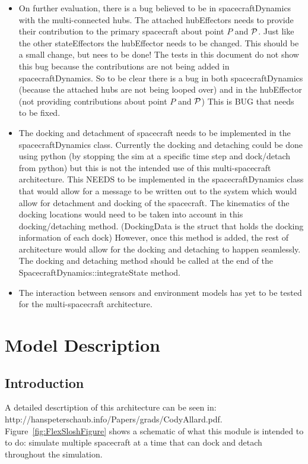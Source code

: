 \begin{itemize}
\item On further evaluation, there is a bug believed to be in spacecraftDynamics with the multi-connected hubs. The attached hubEffectors needs to provide their contribution to the primary spacecraft about point $P$ and $\cal P$. Just like the other stateEffectors the hubEffector needs to be changed. This should be a small change, but nees to be done! The tests in this document do not show this bug because the contributions are not being added in spacecraftDynamics. So to be clear there is a bug in both spacecraftDynamics (because the attached hubs are not being looped over) and in the hubEffector (not providing contributions about point $P$ and $\cal P$) This is BUG that needs to be fixed.
 
\item The docking and detachment of spacecraft needs to be implemented in the spacecraftDynamics class. Currently the docking and detaching could be done using python (by stopping the sim at a specific time step and dock/detach from python) but this is not the intended use of this multi-spacecraft architecture. This NEEDS to be implemented in the spacecraftDynamics class that would allow for a message to be written out to the system which would allow for detachment and docking of the spacecraft. The kinematics of the docking locations would need to be taken into account in this docking/detaching method. (DockingData is the struct that holds the docking information of each dock) However, once this method is added, the rest of architecture would allow for the docking and detaching to happen seamlessly. The docking and detaching method should be called at the end of the SpacecraftDynamics::integrateState method.

\item The interaction between sensors and environment models has yet to be tested for the multi-spacecraft architecture. 
 
\end{itemize}

\section{Model Description}

\subsection{Introduction}

A detailed descrtiption of this architecture can be seen in: http://hanspeterschaub.info/Papers/grads/CodyAllard.pdf. Figure~\ref{fig:FlexSloshFigure} shows a schematic of what this module is intended to to do: simulate multiple spacecraft at a time that can dock and detach throughout the simulation. 

